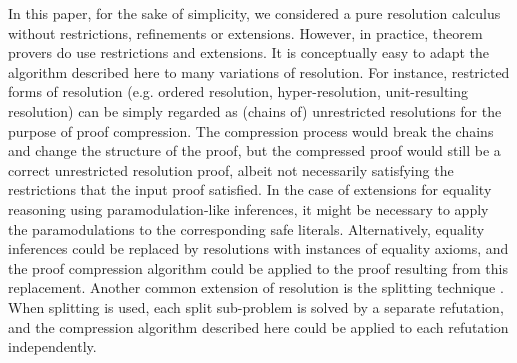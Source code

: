 In this paper, for the sake of simplicity, we considered a pure resolution calculus without restrictions, refinements or extensions. However, in practice, theorem provers do use restrictions and extensions. It is conceptually easy to adapt the algorithm described here to many variations of resolution. For instance, restricted forms of resolution (e.g. ordered resolution, hyper-resolution, unit-resulting resolution) can be simply regarded as (chains of) unrestricted resolutions for the purpose of proof compression. The compression process would break the chains and change the structure of the proof, but the compressed proof would still be a correct unrestricted resolution proof, albeit not necessarily satisfying the restrictions that the input proof satisfied. In the case of extensions for equality reasoning using paramodulation-like inferences, it might be necessary to apply the paramodulations to the corresponding safe literals. Alternatively, equality inferences could be replaced by resolutions with instances of equality axioms, and the proof compression algorithm could be applied to the proof resulting from this replacement. Another common extension of resolution is the splitting technique \cite{WeidenbachSplitting}. When splitting is used, each split sub-problem is solved by a separate refutation, and the compression algorithm described here could be applied to each refutation independently.








